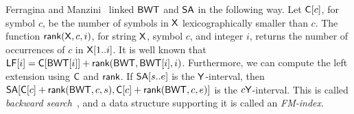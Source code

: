Ferragina and Manzini~\cite{fm2005} linked $\mbox{\rm {\sf BWT}}$ and $\mbox{\rm {\sf SA}}$ in the
following way.  
Let $\mbox{\rm {\sf C}}[c]$, for symbol $c$, be the number of symbols
in $\mathsf{X}$ lexicographically smaller than $c$.  The function
$\textsf{rank}(\mathsf{X},c,i)$, for string $\mathsf{X}$, symbol $c$, and integer $i$, returns
the number of occurrences of $c$ in $\mathsf{X}[1..i]$.  It is well known that
$\mbox{\rm {\sf LF}}[i] = \mbox{\rm {\sf C}}[\mbox{\rm {\sf BWT}}[i]] + \textsf{rank}(\mbox{\rm {\sf BWT}},\mbox{\rm {\sf BWT}}[i],i)$.  Furthermore, we can
compute the left extension using $\mbox{\rm {\sf C}}$ and $\textsf{rank}$.  If $\mbox{\rm {\sf SA}}[s..e]$ is
the $\mathsf{Y}$-interval,
then
$\mbox{\rm {\sf SA}}[\mbox{\rm {\sf C}}[c]+\textsf{rank}(\mbox{\rm {\sf BWT}},c,s),\mbox{\rm {\sf C}}[c]+\textsf{rank}(\mbox{\rm {\sf BWT}},c,e)]$ is
the $c\mathsf{Y}$-interval.
This is called \emph{backward search}~\cite{fm2005}, and a data
structure supporting it is called an {\em FM-index}.

